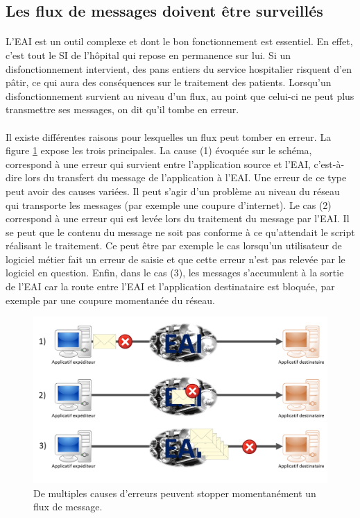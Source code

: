 		\subsection{Les flux de messages doivent être surveillés}
			\paragraph{}%
			L'EAI est un outil complexe et dont le bon fonctionnement est essentiel. En
			effet, c'est tout le SI de l'hôpital qui repose en permanence sur lui. Si
			un disfonctionnement intervient, des pans entiers du
			service hospitalier risquent d'en pâtir, ce qui aura des conséquences sur le
			traitement des patients. Lorsqu'un disfonctionnement survient au niveau d'un
			flux, au point que celui-ci ne peut plus transmettre ses messages, on dit
			qu'il tombe en erreur.

			\paragraph{}%
			Il existe différentes raisons pour lesquelles un flux peut tomber en erreur.
			La figure \ref{interop_erreur} expose les trois principales. La cause (1)
			évoquée sur le schéma, correspond à une erreur qui survient entre l'application source et l'EAI,
			c'est-à-dire lors du transfert du message de l'application à l'EAI. Une
			erreur de ce type peut avoir des causes variées. Il peut s'agir d'un problème
			au niveau du réseau qui transporte les messages (par exemple une coupure
			d'internet). Le cas (2) correspond à une erreur qui est levée
			lors du traitement du message par l'EAI. Il se peut que le contenu du
			message ne soit pas conforme à ce qu'attendait le script réalisant le
			traitement. Ce peut être par exemple le cas lorsqu'un utilisateur de
			logiciel métier fait un erreur de saisie et que cette erreur n'est pas
			relevée par le logiciel en question. Enfin, dans le cas (3), les messages
			s'accumulent à la sortie de l'EAI car la route entre l'EAI et l'application
			destinataire est bloquée, par exemple par une coupure momentanée du réseau.
			\newline
			\begin{figure}[H]
				\centering
				\includegraphics[width=15cm]{../img/error_1.png}
				\caption{\label{interop_erreur} De multiples causes d'erreurs peuvent
				stopper momentanément un flux de message.}
			\end{figure}
			
